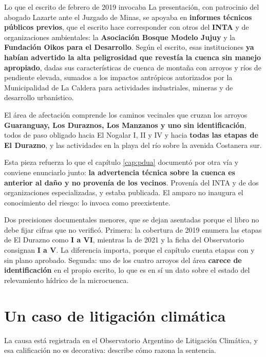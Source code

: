 \begin{ficha}{Lo que el escrito de febrero de 2019 invocaba}
La presentación, con patrocinio del abogado Lazarte ante el Juzgado de Minas, se apoyaba en \textbf{informes técnicos públicos previos}, que el escrito hace corresponder con otros del \textbf{INTA} y de organizaciones ambientales: la \textbf{Asociación Bosque Modelo Jujuy} y la \textbf{Fundación Oikos para el Desarrollo}. Según el escrito, esas instituciones \textbf{ya habían advertido la alta peligrosidad que revestía la cuenca sin manejo apropiado}, dadas sus características de cuenca de montaña con arroyos y ríos de pendiente elevada, sumados a los impactos antrópicos autorizados por la Municipalidad de La Caldera para actividades industriales, mineras y de desarrollo urbanístico.

El área de afectación comprende los caminos vecinales que cruzan los arroyos \textbf{Guaranguay, Los Duraznos, Los Manzanos y uno sin identificación}, todos de paso obligado hacia El Nogalar I, II y IV y hacia \textbf{todas las etapas de El Durazno}, y las actividades en la playa del río sobre la avenida Costanera sur.
\end{ficha}

\begin{cautela}
Esta pieza refuerza lo que el capítulo \ref{cap:pdua} documentó por otra vía y conviene enunciarlo junto: \textbf{la advertencia técnica sobre la cuenca es anterior al daño y no provenía de los vecinos}. Provenía del INTA y de dos organizaciones especializadas, y estaba publicada. El amparo no inaugura el conocimiento del riesgo: lo invoca como preexistente.

Dos precisiones documentales menores, que se dejan asentadas porque el libro no debe fijar cifras que no verificó. Primera: la cobertura de 2019 enumera las etapas de El Durazno como \textbf{I a VI}, mientras la de 2021 y la ficha del Observatorio consignan \textbf{I a V}. La diferencia importa, porque el capítulo cuenta etapas con y sin plano aprobado. Segunda: uno de los cuatro arroyos del área \textbf{carece de identificación} en el propio escrito, lo que es en sí un dato sobre el estado del relevamiento hídrico de la microcuenca.
\end{cautela}

\section{Un caso de litigación climática}
La causa está registrada en el Observatorio Argentino de Litigación Climática, y esa calificación no es decorativa: describe cómo razona la sentencia.

